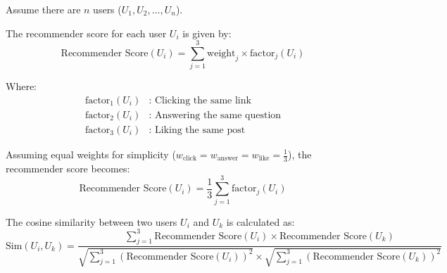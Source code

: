 \documentclass{article}
\begin{document}
Assume there are \(n\) users (\(U_1, U_2, \ldots, U_n\)).

The recommender score for each user \(U_i\) is given by:
\[
\text{Recommender Score}(U_i) = \sum_{j=1}^{3} \text{weight}_j \times \text{factor}_j(U_i)
\]

Where:
\begin{align*}
\text{factor}_1(U_i) &\text{: Clicking the same link} \\
\text{factor}_2(U_i) &\text{: Answering the same question} \\
\text{factor}_3(U_i) &\text{: Liking the same post}
\end{align*}

Assuming equal weights for simplicity (\(w_{\text{click}} = w_{\text{answer}} = w_{\text{like}} = \frac{1}{3}\)), the recommender score becomes:
\[
\text{Recommender Score}(U_i) = \frac{1}{3} \sum_{j=1}^{3} \text{factor}_j(U_i)
\]

The cosine similarity between two users \(U_i\) and \(U_k\) is calculated as:
\[
\text{Sim}(U_i, U_k) = \frac{\sum_{j=1}^{3} \text{Recommender Score}(U_i) \times \text{Recommender Score}(U_k)}{\sqrt{\sum_{j=1}^{3} (\text{Recommender Score}(U_i))^2} \times \sqrt{\sum_{j=1}^{3} (\text{Recommender Score}(U_k))^2}}
\]
\end{document}
